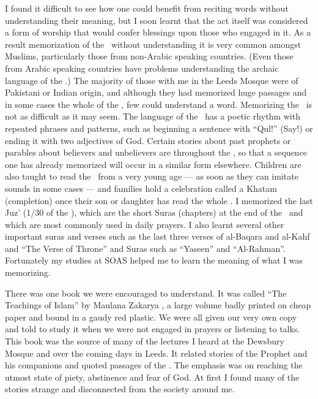 \documentclass[12pt]{memoir}
\begin{document}
I found it difficult to see how one could benefit from reciting words
without understanding their meaning,
but I soon learnt that the act itself was considered a form of worship
that would confer blessings upon those who engaged in it.
As a result memorization of the \Quran\ without understanding it
is very common amongst Muslims,
particularly those from non-Arabic speaking countries.
(Even those from Arabic speaking countries
have problems understanding the archaic language of the \Quran.)
The majority of those with me in the Leeds Mosque
were of Pakistani or Indian origin,
and although they had memorized huge passages
and in some cases the whole of the \Quran, few could understand a word.
Memorizing the \Quran\ is not as difficult as it may seem.
The language of the \Quran\ has a poetic rhythm
with repeated phrases and patterns,
such as beginning a sentence with “Qul!” (Say!)
or ending it with two adjectives of God.
Certain stories about past prophets or parables about believers
and unbelievers are  throughout the \Quran,
so that a sequence one has already memorized
will occur in a similar form elsewhere.
Children are also taught to read the \Quran\ from a very young age —
as soon as they can imitate sounds in some cases —
and families hold a celebration called a Khatam (completion)
once their son or daughter has read the whole \Quran.
I memorized the last Juz’ (1/30 of the \Quran),
which are the short Suras (chapters) at the end of the \Quran\
and which are most commonly used in daily prayers.
I also learnt several other important suras and verses
such as the last three verses of al-Baqara and al-Kahf and
“The Verse of Throne” and Suras such as “Yaseen” and “Al-Rahman”.
Fortunately my studies at SOAS helped me
to learn the meaning of what I was memorizing.

There was one book we were encouraged to understand.
It was called “The Teachings of Islam”
by Maulana Zakarya ,
a large volume badly printed on cheap paper and bound in a gaudy red plastic.
We were all given our very own copy and told to study it
when we were not engaged in prayers or listening to talks.
This book was the source of many of the lectures
I heard at the Dewsbury Mosque and over the coming days in Leeds.
It related stories of the Prophet and his companions
and quoted passages of the \Quran.
The emphasis was on reaching the utmost state of piety,
abstinence and fear of God.
At first I found many of the stories strange
and disconnected from the society around me.
\end{document}
